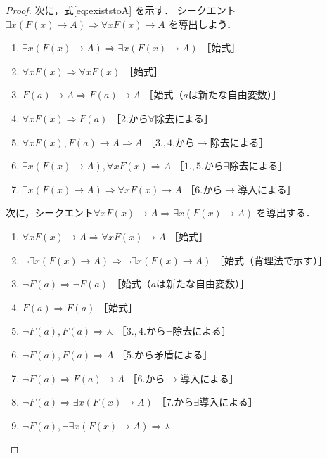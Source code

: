 \begin{proof}
     次に，式\eqref{eq:existstoA}
     を示す．
     シークエント$\exists x (F(x) \to A ) \Longrightarrow \forall x F(x) \to A$
     を導出しよう．
     \begin{enumerate}[1. ]
       \item $\exists x (F(x) \to A ) \Longrightarrow \exists x (F(x) \to A)$
              \quad ［始式］
       \item $\forall x F(x) \Longrightarrow \forall x F(x)$ \quad ［始式］
       \item $F(a) \to A \Longrightarrow F(a) \to A $ \quad ［始式（$a$は新たな自由変数）］
       \item $\forall x F(x) \Longrightarrow F(a)$ \quad ［2.から$\forall$除去による］
       \item $\forall x F(x) ,  F(a) \to A \Longrightarrow A$
              \quad ［$3., 4.$から$\to$除去による］
       \item $\exists x (F(x) \to A) ,  \forall x F(x) \Longrightarrow A$
              \quad ［$1., 5.$から$\exists$除去による］
       \item $\exists x (F(x) \to A) \Longrightarrow \forall x F(x) \to A$
              \quad ［6.から$\to$導入による］
     \end{enumerate}
     次に，シークエント$\forall x F(x) \to A \Longrightarrow \exists x (F(x) \to A)$
     を導出する．
     \begin{enumerate}[1. ]
       \item $\forall x F(x) \to A \Longrightarrow \forall x F(x) \to A $
              \quad ［始式］
       \item $\lnot \exists x (F(x) \to A) \Longrightarrow \lnot \exists x (F(x) \to A)$
              \quad ［始式（背理法で示す）］
       \item $\lnot F(a) \Longrightarrow \lnot F(a)$ \quad ［始式（$a$は新たな自由変数）］
       \item $F(a) \Longrightarrow F(a)$ \quad ［始式］
       \item $\lnot F(a) ,  F(a) \Longrightarrow \curlywedge$
              \quad ［$3., 4.$から$\lnot$除去による］
       \item $\lnot F(a) ,  F(a) \Longrightarrow A$ \quad ［5.から矛盾による］
       \item $\lnot F(a) \Longrightarrow F(a) \to A$ \quad ［6.から$\to$導入による］
       \item $\lnot F(a) \Longrightarrow \exists x (F(x) \to A)$
              \quad ［7.から$\exists$導入による］
       \item $\lnot F(a) ,  \lnot \exists x (F(x) \to A) \Longrightarrow \curlywedge$

\end{enumerate}
\end{proof}
